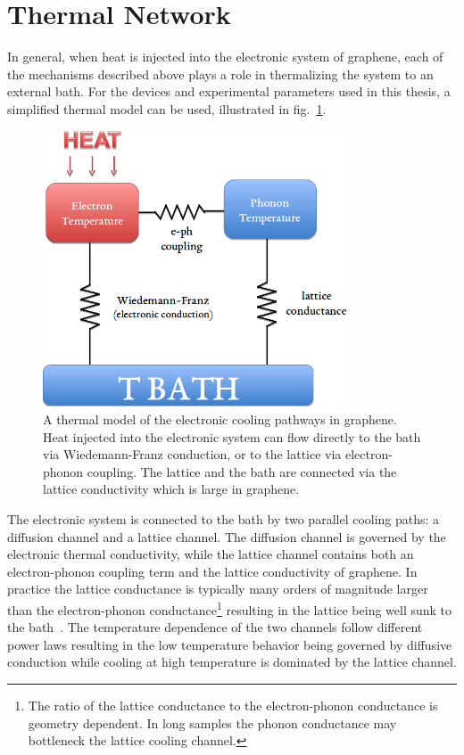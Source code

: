 \section{Thermal Network}
In general, when heat is injected into the electronic system of graphene, each of the mechanisms described above plays a role in thermalizing the system to an external bath. For the devices and experimental parameters used in this thesis, a simplified thermal model can be used, illustrated in fig.~\ref{fig:thermal_diagram}.
\begin{figure}
\centering
\includegraphics[width = 90mm]{figures/electronic_cooling/Thermal_diagram.png}
\caption{A thermal model of the electronic cooling pathways in graphene. Heat injected into the electronic system can flow directly to the bath via Wiedemann-Franz conduction, or to the lattice via electron-phonon coupling. The lattice and the bath are connected via the lattice conductivity which is large in graphene.}
\label{fig:thermal_diagram}
\end{figure}
The electronic system is connected to the bath by two parallel cooling paths: a diffusion channel and a lattice channel. The diffusion channel is governed by the electronic thermal conductivity, while the lattice channel contains both an electron-phonon coupling term and the lattice conductivity of graphene. In practice the lattice conductance is typically many orders of magnitude larger than the electron-phonon conductance\footnote{The ratio of the lattice conductance to the electron-phonon conductance is geometry dependent. In long samples the phonon conductance may bottleneck the lattice cooling channel.} resulting in the lattice being well sunk to the bath~\cite{crossno_development_2015,fong_measurement_2013, seol_two-dimensional_2010}. The temperature dependence of the two channels follow different power laws resulting in the low temperature behavior being governed by diffusive conduction while cooling at high temperature is dominated by the lattice channel.

